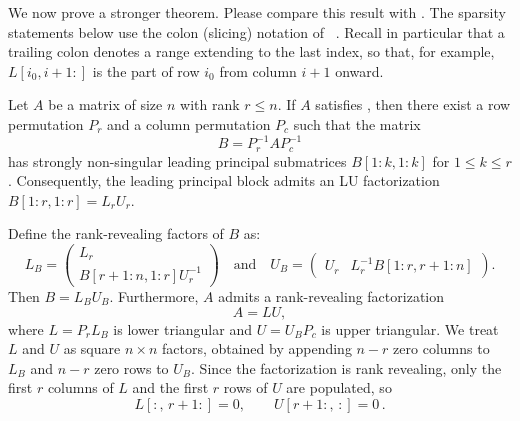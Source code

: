 \documentclass[10pt,twoside]{siamart1116}
\numberwithin{theorem}{section}
\begin{document}
We now prove a stronger theorem. Please compare this result with . The sparsity statements below use the colon (slicing) notation of ~\cite{golub_matrix_2013}. Recall in particular that a trailing colon denotes a range extending to the last index, so that, for example, $L[i_0, i+1:]$ is the part of row $i_0$ from column $i+1$ onward.

\begin{theorem}\label{thm:main2}
  Let $A$ be a matrix of size $n$ with rank $r \le n$. If $A$ satisfies , then there exist a row permutation $P_r$ and a column permutation $P_c$ such that the matrix
  \[ B = P_r^{-1} A P_c^{-1} \]
  has strongly non-singular leading principal submatrices $B[1:k,1:k]$ for $1 \le k \le r$. Consequently, the leading principal block admits an LU factorization $B[1:r,1:r] = L_r U_r$.

  Define the rank-revealing factors of $B$ as:
  \[
    L_B =
    \begin{pmatrix} L_r \\ B[r+1:n, 1:r] U_r^{-1}
    \end{pmatrix}
    \quad \text{and} \quad
    U_B =
    \begin{pmatrix} U_r & L_r^{-1} B[1:r, r+1:n]
    \end{pmatrix}.
  \]
  Then $B = L_B U_B$. Furthermore, $A$ admits a rank-revealing factorization
  \[ A = L U, \]
  where $L = P_r L_B$ is lower triangular and $U = U_B P_c$ is upper triangular. We treat $L$ and $U$ as square $n \times n$ factors, obtained by appending $n - r$ zero columns to $L_B$ and $n - r$ zero rows to $U_B$. Since the factorization is rank revealing, only the first $r$ columns of $L$ and the first $r$ rows of $U$ are populated, so
  \[ L[:,\, r+1:] = 0, \qquad U[r+1:,\, :] = 0 \,. \]


\end{theorem}
\end{document}
